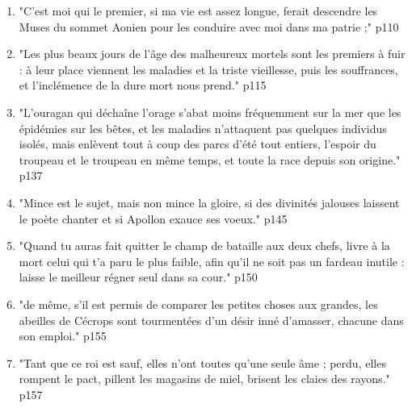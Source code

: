 \documentclass[a4paper,12pt]{book}
\begin{document}
{\begin{enumerate}
\item "C'est moi qui le premier, si ma vie est assez longue, ferait descendre les Muses du sommet Aonien pour les conduire avec moi dans ma patrie ;" p110
\item "Les plus beaux jours de l'âge des malheureux mortels sont les premiers à fuir : à leur place viennent les maladies et la triste vieillesse, puis les souffrances, et l'inclémence de la dure mort nous prend." p115
\item "L'ouragan qui déchaîne l'orage s'abat moins fréquemment sur la mer que les épidémies sur les bêtes, et les maladies n'attaquent pas quelques individus isolés, mais enlèvent tout à coup des parcs d'été tout entiers, l'espoir du troupeau et le troupeau en même temps, et toute la race depuis son origine." p137
\item "Mince est le sujet, mais non mince la gloire, si des divinités jalouses laissent le poète chanter et si Apollon exauce ses voeux." p145
\item "Quand tu auras fait quitter le champ de bataille aux deux chefs, livre à la mort celui qui t'a paru le plus faible, afin qu'il ne soit pas un fardeau inutile : laisse le meilleur régner seul dans sa cour." p150
\item "de même, s'il est permis de comparer les petites choses aux grandes, les abeilles de Cécrops sont tourmentées d'un désir inné d'amasser, chacune dans son emploi." p155
\item "Tant que ce roi est sauf, elles n'ont toutes qu'une seule âme ; perdu, elles rompent le pact, pillent les magasins de miel, brisent les claies des rayons." p157
\end{enumerate}
}
\end{document}
